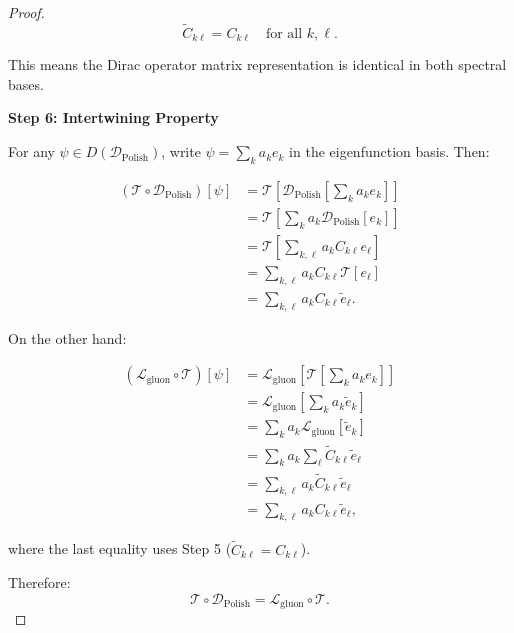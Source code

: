 \begin{theorem}
\begin{proof}
\begin{equation}
\tilde{C}_{k\ell} = C_{k\ell} \quad \text{for all } k, \ell.
\end{equation}

This means the Dirac operator matrix representation is identical in both spectral bases.

\textbf{Step 6: Intertwining Property}

For any $\psi \in D(\mathcal{D}_{\mathrm{Polish}})$, write $\psi = \sum_k a_k e_k$ in the eigenfunction basis. Then:

\begin{equation}
\begin{aligned}
(\mathcal{T} \circ \mathcal{D}_{\mathrm{Polish}})[\psi] &= \mathcal{T}[\mathcal{D}_{\mathrm{Polish}}[\sum_k a_k e_k]] \\
&= \mathcal{T}[\sum_k a_k \mathcal{D}_{\mathrm{Polish}}[e_k]] \\
&= \mathcal{T}[\sum_{k,\ell} a_k C_{k\ell} e_\ell] \\
&= \sum_{k,\ell} a_k C_{k\ell} \mathcal{T}[e_\ell] \\
&= \sum_{k,\ell} a_k C_{k\ell} \tilde{e}_\ell.
\end{aligned}
\end{equation}

On the other hand:

\begin{equation}
\begin{aligned}
(\mathcal{L}_{\mathrm{gluon}} \circ \mathcal{T})[\psi] &= \mathcal{L}_{\mathrm{gluon}}[\mathcal{T}[\sum_k a_k e_k]] \\
&= \mathcal{L}_{\mathrm{gluon}}[\sum_k a_k \tilde{e}_k] \\
&= \sum_k a_k \mathcal{L}_{\mathrm{gluon}}[\tilde{e}_k] \\
&= \sum_k a_k \sum_{\ell} \tilde{C}_{k\ell} \tilde{e}_\ell \\
&= \sum_{k,\ell} a_k \tilde{C}_{k\ell} \tilde{e}_\ell \\
&= \sum_{k,\ell} a_k C_{k\ell} \tilde{e}_\ell,
\end{aligned}
\end{equation}

where the last equality uses Step 5 ($\tilde{C}_{k\ell} = C_{k\ell}$).

Therefore:
\begin{equation}
\mathcal{T} \circ \mathcal{D}_{\mathrm{Polish}} = \mathcal{L}_{\mathrm{gluon}} \circ \mathcal{T}.
\end{equation}


\end{proof}
\end{theorem}
